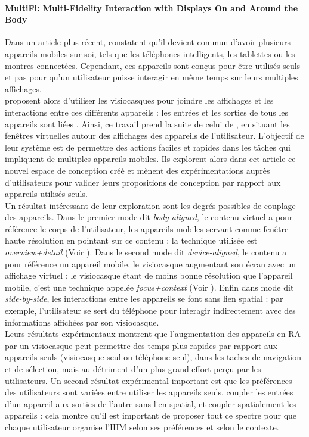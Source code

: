 \paragraph{\foreignlanguage{english}{MultiFi: Multi-Fidelity Interaction with Displays On and Around the Body}}
Dans un article plus récent, \cite{GrubertKranzQuigley2015} constatent qu'il devient commun d'avoir plusieurs appareils mobiles sur soi, tels que les téléphones intelligents, les tablettes ou les montres connectées. Cependant, ces appareils sont conçus pour être utilisés seuls et pas pour qu'un utilisateur puisse interagir en même temps sur leurs multiples affichages.\\
\citeauthor{GrubertKranzQuigley2015} proposent alors d'utiliser les visiocasques pour joindre les affichages et les interactions entre ces différents appareils : les entrées et les sorties de tous les appareils sont liées . Ainsi, ce travail prend la suite de celui de \citet{EnsFinneganIrani2014}, en situant les fenêtres virtuelles autour des affichages des appareils de l'utilisateur. L'objectif de leur système est de permettre des actions faciles et rapides dans les tâches qui impliquent de multiples appareils mobiles. Ils explorent alors dans cet article ce nouvel espace de conception créé et mènent des expérimentations auprès d'utilisateurs pour valider leurs propositions de conception par rapport aux appareils utilisés seuls.\\
Un résultat intéressant de leur exploration sont les degrés possibles de couplage des appareils. Dans le premier mode dit \emph{body-aligned}, le contenu virtuel a pour référence le corps de l'utilisateur, les appareils mobiles servant comme fenêtre haute résolution en pointant sur ce contenu : la technique utilisée est \emph{overview+detail} (Voir \citep{BergeSerranoPerelmanEtAl2014}). Dans le second mode dit \emph{device-aligned}, le contenu a pour référence un appareil mobile, le visiocasque augmentant son écran avec un affichage virtuel : le visiocasque étant de moins bonne résolution que l'appareil mobile, c'est une technique appelée \emph{focus+context} (Voir \cite{BaudischGoodStewart2001}). Enfin dans mode dit \emph{side-by-side}, les interactions entre les appareils se font sans lien spatial : par exemple, l'utilisateur se sert du téléphone pour interagir indirectement avec des informations affichées par son visiocasque.\\
Leurs résultats expérimentaux montrent que l'augmentation des appareils en RA par un visiocasque peut permettre des temps plus rapides par rapport aux appareils seuls (visiocasque seul ou téléphone seul), dans les taches de navigation et de sélection, mais au détriment d'un plus grand effort perçu par les utilisateurs. Un second résultat expérimental important est que les préférences des utilisateurs sont variées entre utiliser les appareils seuls, coupler les entrées d'un appareil aux sorties de l'autre sans lien spatial, et coupler spatialement les appareils : cela montre qu'il est important de proposer tout ce spectre pour que chaque utilisateur organise l'IHM selon ses préférences et selon le contexte.\\

